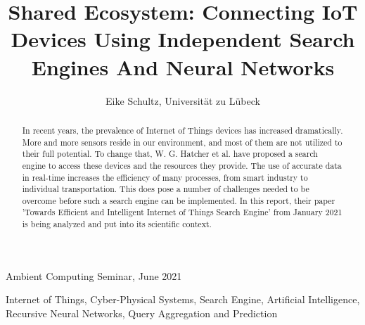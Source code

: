 \documentclass [journal]{IEEEtran}
\begin{document}
 \title{Shared Ecosystem: Connecting IoT Devices Using Independent Search Engines And Neural Networks}

 \author{Eike Schultz, Universität zu Lübeck}

{Ambient Computing Seminar, June 2021}

 \maketitle

 \begin{abstract}
In recent years, the prevalence of Internet of Things devices has increased dramatically. More and more sensors reside in our environment, and most of them are not utilized to their full potential. To change that, W. G. Hatcher et al. have proposed a search engine to access these devices and the resources they provide. The use of accurate data in real-time increases the efficiency of many processes, from smart industry to individual transportation. This does pose a number of challenges needed to be overcome before such a search engine can be implemented. In this report, their paper 'Towards Efficient and Intelligent Internet of Things Search Engine' from January 2021 is being analyzed and put into its scientific context.
 \end{abstract}
 
 \begin{IEEEkeywords}
Internet of Things, Cyber-Physical Systems, Search Engine, Artificial Intelligence, Recursive Neural Networks, Query Aggregation and Prediction
 \end{IEEEkeywords}

 \IEEEpeerreviewmaketitle

  
\end{document}
